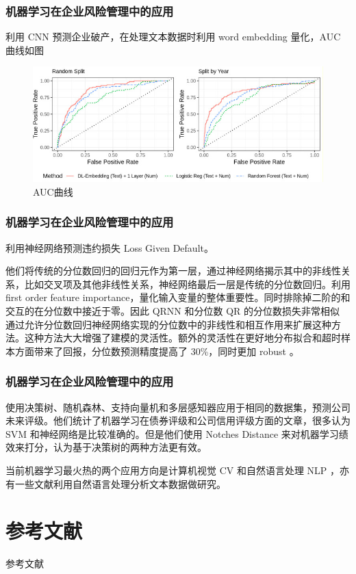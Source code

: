 \documentclass[mathserif,envcountsect,fontset=mac]{ctexbeamer}
\begin{document}
\begin{frame}
    \frametitle{机器学习在企业风险管理中的应用}
    \Textcite{mai2019deep} 利用 CNN 预测企业破产，在处理文本数据时利用 word embedding 量化，AUC 曲线如图
    \begin{figure}
        \includegraphics[width=\linewidth]{../lib/mlinerm.jpg}
        \caption{AUC曲线}
    \end{figure}
\end{frame}
\begin{frame}
    \frametitle{机器学习在企业风险管理中的应用}
    \Textcite{kellner2022opening} 利用神经网络预测违约损失 Loss Given Default。

    他们将传统的分位数回归的回归元作为第一层，通过神经网络揭示其中的非线性关系，比如交叉项及其他非线性关系，神经网络最后一层是传统的分位数回归。利用 first order feature importance，量化输入变量的整体重要性。同时排除掉二阶的和交互的在分位数中接近于零。因此 QRNN 和分位数 QR 的分位数损失非常相似
    通过允许分位数回归神经网络实现的分位数中的非线性和相互作用来扩展这种方法。这种方法大大增强了建模的灵活性。额外的灵活性在更好地分布拟合和超时样本方面带来了回报，分位数预测精度提高了 30\%，同时更加 robust 。
\end{frame}
\begin{frame}
    \frametitle{机器学习在企业风险管理中的应用}
    \Textcite{golbayani2020comparative}
    使用决策树、随机森林、支持向量机和多层感知器应用于相同的数据集，预测公司未来评级。他们统计了机器学习在债券评级和公司信用评级方面的文章，很多认为 SVM 和神经网络是比较准确的。但是他们使用 Notches Distance 来对机器学习绩效来打分，认为基于决策树的两种方法更有效。

    当前机器学习最火热的两个应用方向是计算机视觉 CV 和自然语言处理 NLP ，亦有一些文献利用自然语言处理分析文本数据做研究。
\end{frame}
\section{参考文献}
\begin{frame}{参考文献}
    \printbibliography
\end{frame}
\end{document}
